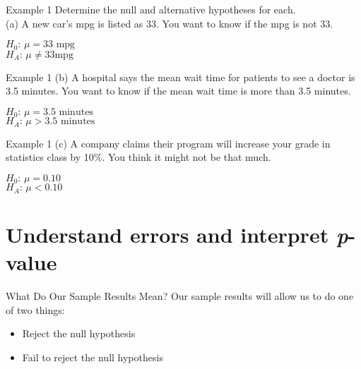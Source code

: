 \documentclass[t]{beamer}
\begin{document}
\begin{frame}{Example 1}
Determine the null and alternative hypotheses for each.	\newline\\
(a) \quad A new car's mpg is listed as 33. You want to know if the mpg is not 33.	\newline\\	\pause

$H_0: \, \mu = 33\text{ mpg}$	\newline\\	\pause
$H_A: \, \mu \neq 33\text{mpg}$ 
\end{frame}

\begin{frame}{Example 1}
(b) \quad A hospital says the mean wait time for patients to see a doctor is 3.5 minutes. You want to know if the mean wait time is more than 3.5 minutes.	\newline\\	\pause

$H_0: \, \mu = 3.5\text{ minutes}$ \newline\\	\pause
$H_A: \, \mu > 3.5\text{ minutes}$
\end{frame}

\begin{frame}{Example 1}
(c) \quad A company claims their program will increase your grade in statistics class by 10\%. You think it might not be that much.	\newline\\	\pause

$H_0: \, \mu = 0.10$ \newline\\	\pause
$H_A: \, \mu < 0.10$
\end{frame}

\section{Understand errors and interpret \textit{p}-value}

\begin{frame}{What Do Our Sample Results Mean?}
Our sample results will allow us to do one of two things:	\newline\\
\begin{itemize}
	\item<2->{Reject the null hypothesis} \newline\\
	\item<3->{Fail to reject the null hypothesis}
\end{itemize}
\end{frame}
\end{document}
